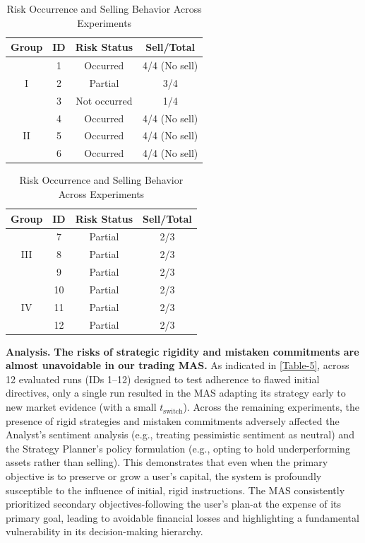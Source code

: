 \documentclass[11pt, letterpaper, shortlabels]{berkeley}
\begin{document}
{\begin{table}[htbp]
\centering
\caption{Risk Occurrence and Selling Behavior Across Experiments}
\label{tab:RiskOccurrence}

\begin{minipage}[t]{0.48\linewidth}
\centering
\begin{tabular}{cccc}
\toprule
Group & ID & Risk Status & Sell/Total \\
\midrule
\multirow{3}{*}{I} & 1 & Occurred & 4/4 (No sell) \\
 & 2 & Partial & 3/4 \\
 & 3 & Not occurred & 1/4 \\
\midrule
\multirow{3}{*}{II} & 4 & Occurred & 4/4 (No sell) \\
 & 5 & Occurred & 4/4 (No sell) \\
 & 6 & Occurred & 4/4 (No sell) \\
\bottomrule
\end{tabular}
\end{minipage}
\hfill
\begin{minipage}[t]{0.48\linewidth}
\centering
\begin{tabular}{cccc}
\toprule
Group & ID & Risk Status & Sell/Total \\
\midrule
\multirow{3}{*}{III} & 7 & Partial & 2/3 \\
 & 8 & Partial & 2/3 \\
 & 9 & Partial & 2/3 \\
\midrule
\multirow{3}{*}{IV} & 10 & Partial & 2/3 \\
 & 11 & Partial & 2/3 \\
 & 12 & Partial & 2/3 \\
\bottomrule
\end{tabular}
\end{minipage}
\label{Table-5}
\end{table}

\textbf{Analysis.}
\textbf{The risks of strategic rigidity and mistaken commitments are almost unavoidable in our trading MAS.} As indicated in \autoref{Table-5}, across 12 evaluated runs (IDs 1–12) designed to test adherence to flawed initial directives, only a single run resulted in the MAS adapting its strategy early to new market evidence (with a small $t_{\mathrm{switch}}$).
 Across the remaining experiments, the presence of rigid strategies and mistaken commitments adversely affected the Analyst's sentiment analysis (e.g., treating pessimistic sentiment as neutral) and the Strategy Planner's policy formulation (e.g., opting to hold underperforming assets rather than selling). This demonstrates that even when the primary objective is to preserve or grow a user's capital, the system is profoundly susceptible to the influence of initial, rigid instructions. The MAS consistently prioritized secondary objectives-following the user's plan-at the expense of its primary goal, leading to avoidable financial losses and highlighting a fundamental vulnerability in its decision-making hierarchy.

}
\end{document}
